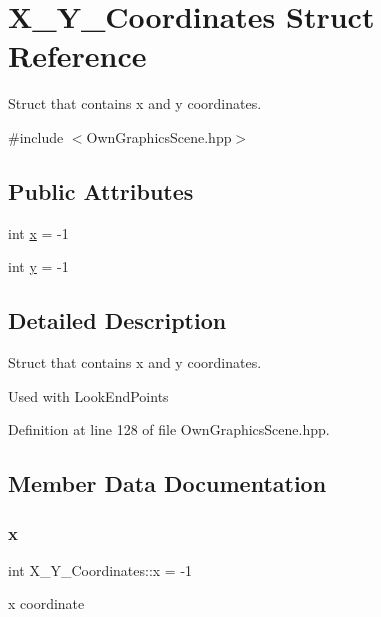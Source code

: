 \hypertarget{structX__Y__Coordinates}{}\section{X\+\_\+\+Y\+\_\+\+Coordinates Struct Reference}
\label{structX__Y__Coordinates}


Struct that contains x and y coordinates.  




{\ttfamily \#include $<$Own\+Graphics\+Scene.\+hpp$>$}

\subsection*{Public Attributes}
\begin{DoxyCompactItemize}
\item 
int \mbox{\hyperlink{structX__Y__Coordinates_a89f7ab800d6777b26a037e82501c6798}{x}} = -\/1
\item 
int \mbox{\hyperlink{structX__Y__Coordinates_a4a608b81d10b65d5b12596ca82df34f6}{y}} = -\/1
\end{DoxyCompactItemize}


\subsection{Detailed Description}
Struct that contains x and y coordinates. 

Used with Look\+End\+Points 

Definition at line 128 of file Own\+Graphics\+Scene.\+hpp.



\subsection{Member Data Documentation}
\mbox{\label{structX__Y__Coordinates_a89f7ab800d6777b26a037e82501c6798}} 
\subsubsection{\texorpdfstring{x}{x}}
{\footnotesize\ttfamily int X\+\_\+\+Y\+\_\+\+Coordinates\+::x = -\/1}

x coordinate 

